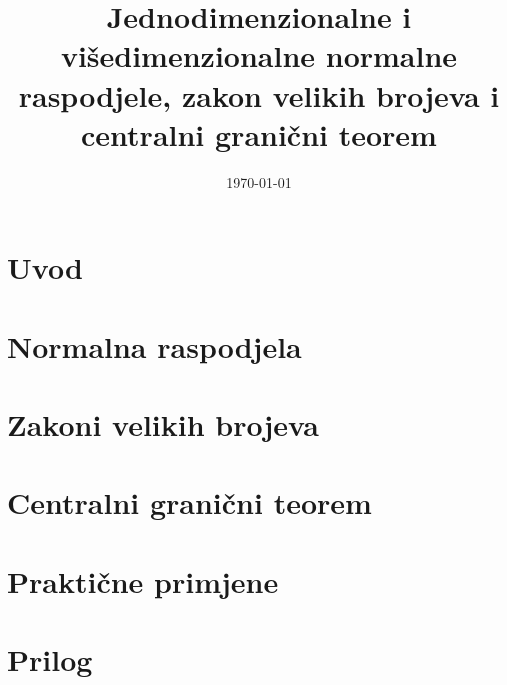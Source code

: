 \documentclass[11pt]{article}
\date{\today}
\title{Jednodimenzionalne i višedimenzionalne normalne raspodjele, zakon velikih
brojeva i centralni granični teorem}
\begin{document}
\maketitle
\newpage
\tableofcontents
\newpage
{}

\section{Uvod} \label{sec:intro}


\section{Normalna raspodjela} \label{sec:gauss}


\section{Zakoni velikih brojeva} \label{sec:lln}


\section{Centralni granični teorem} \label{sec:clt}


\section{Praktične primjene}


\section{Prilog}

\end{document}
